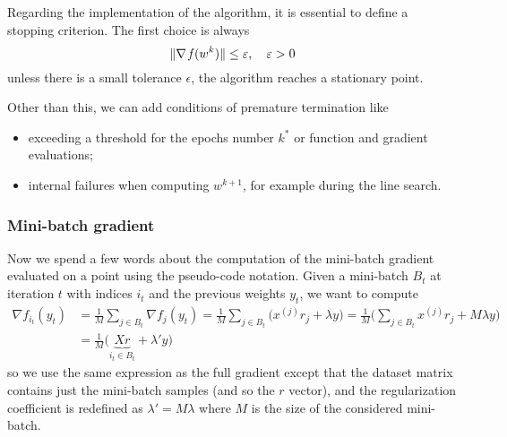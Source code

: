 Regarding the implementation of the algorithm, it is essential to define a stopping criterion. The first choice is always
\begin{equation}\label{eq:stopping1}
\lVert\nabla\operatorname*{\mathit{f}}(w^k)\rVert\leq\varepsilon,\quad\varepsilon>0
\end{equation}
unless there is a small tolerance $\epsilon$, the algorithm reaches a stationary point.

Other than this, we can add conditions of premature termination like
\begin{itemize}
\item exceeding a threshold for the epochs number $k^\ast$ or function and gradient evaluations;
\item internal failures when computing $w^{k+1}$, for example during the line search.
\end{itemize}


\subsubsection*{Mini-batch gradient}

Now we spend a few words about the computation of the mini-batch gradient evaluated on a point using the pseudo-code notation. Given a mini-batch $B_t$ at iteration $t$ with indices $i_t$ and the previous weights $y_t$, we want to compute
\begin{equation*}
\begin{split}
\nabla f_{i_t}(y_t) &= \frac{1}{M}\sum_{j\in B_t}\nabla f_j(y_t)=\frac{1}{M}\sum_{j\in B_t}\bigl(x^{(j)}r_j+\lambda y\bigr)= \frac{1}{M}\biggl(\sum_{j\in B_t}x^{(j)}r_j+M\lambda y\biggr) \\
 &= \frac{1}{M}\bigl(\underbrace{Xr}_{i_t\in B_t}+\lambda' y\bigr)
\end{split}
\end{equation*}
so we use the same expression as the full gradient except that the dataset matrix contains just the mini-batch samples (and so the $r$ vector), and the regularization coefficient is redefined as $\lambda'=M\lambda$ where $M$ is the size of the considered mini-batch.

